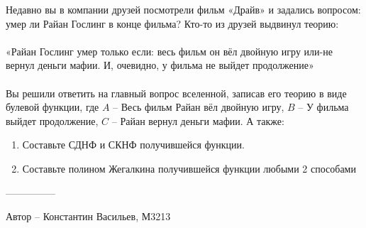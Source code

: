 \question
Недавно вы в компании друзей посмотрели фильм «Драйв» и задались вопросом: умер ли Райан Гослинг в конце фильма? Кто-то из друзей выдвинул теорию:
\\
\\
«Райан Гослинг умер только если: весь фильм он вёл двойную игру или-не вернул деньги мафии. И, очевидно, у фильма не выйдет продолжение»
\\
\\
Вы решили ответить на главный вопрос вселенной, записав его теорию в виде булевой функции, где $A$ – Весь фильм Райан вёл двойную игру, $B$ – У фильма выйдет продолжение, $C$ – Райан вернул деньги мафии. А также:
\begin{enumerate}
    \item Составьте СДНФ и СКНФ получившейся функции.
    \item Составьте полином Жегалкина получившейся функции любыми 2 способами
\end{enumerate}

---------------

Автор -- Константин Васильев, М3213